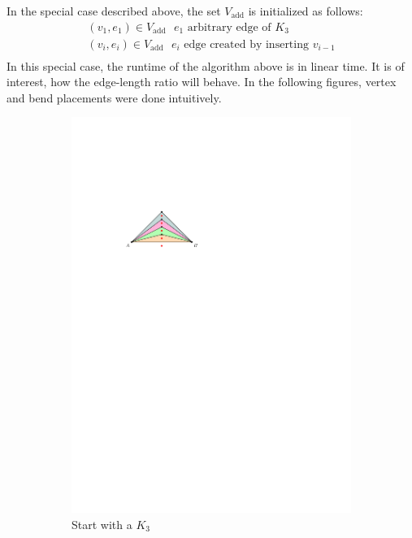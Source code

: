 In the special case described above, the set $V_{\text{add}}$ is initialized as follows:
\begin{align*}
	(v_1,e_1)\in V_{\text{add}}~~~e_1\text{ arbitrary edge of }K_3\\
	(v_i,e_i)\in V_{\text{add}}~~~e_i\text{ edge created by inserting }v_{i-1}\\	
\end{align*}
In this special case, the runtime of the algorithm above is in linear time. It is of interest, how the edge-length ratio will behave. In the following figures, vertex and bend placements were done intuitively.
\begin{figure}[H]
	\centering
	\begin{subfigure}{0.4\textwidth}
		\centering
		\includegraphics[width=.7\linewidth,page=2]{drawings/k-trees.pdf}
		\caption{Start with a $K_3$}
	\end{subfigure}
\begin{subfigure}{0.4\textwidth}
	\centering

\end{subfigure}
\end{figure}
